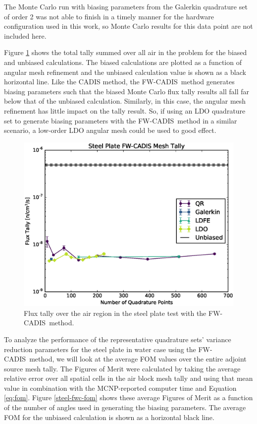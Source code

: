 \documentclass{article} %
\newcommand{\fwc}{\mbox{FW-CADIS}}
\begin{document}
The Monte Carlo run with biasing parameters from the Galerkin quadrature set
of order 2 was not able to finish in a timely manner for the hardware
configuration used in this work, so Monte Carlo results for this data point
are not included here.

Figure \ref{steel-fwc-tally} shows the total tally summed over all air in the
problem for the biased and unbiased calculations. The biased calculations are
plotted as a function of angular mesh refinement and the unbiased calculation
value is shown as a black horizontal line. Like the CADIS method, the \fwc\
method generates biasing parameters such that the biased Monte Carlo flux
tally results all fall far below that of the unbiased calculation. Similarly,
in this case, the angular mesh refinement has little impact on the tally
result. So, if using an LDO quadrature set to generate biasing parameters with
the \fwc\ method in a similar scenario, a low-order LDO angular mesh could be
used to good effect.

\begin{figure}[!htb]
\centering
\includegraphics[max height=0.445\textheight]{img/steel-fwcadis-tally.eps}
\caption{Flux tally over the air region in the steel plate test with the \fwc\ method.}
\label{steel-fwc-tally}
\end{figure}

To analyze the performance of the representative quadrature sets' variance
reduction parameters for the steel plate in water case using the \fwc\ method,
we will look at the average FOM values over the entire adjoint source mesh
tally. The Figures of Merit were calculated by taking the average relative
error over all spatial cells in the air block mesh tally and using that mean
value in combination with the MCNP-reported computer time and Equation
\ref{eq:fom}. Figure \ref{steel-fwc-fom} shows these average Figures of Merit
as a function of the number of angles used in generating the biasing
parameters. The average FOM for the unbiased calculation is shown as a
horizontal black line.
\end{document}
